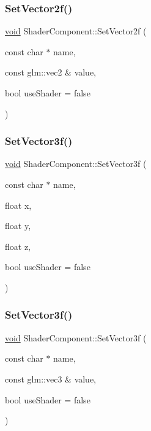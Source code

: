 \subsubsection{\texorpdfstring{Set\+Vector2f()}{SetVector2f()}\hspace{0.1cm}{\footnotesize\ttfamily [2/2]}}
{\footnotesize\ttfamily \hyperlink{imgui__impl__opengl3__loader_8h_ac668e7cffd9e2e9cfee428b9b2f34fa7}{void} Shader\+Component\+::\+Set\+Vector2f (\begin{DoxyParamCaption}\item[{const char $\ast$}]{name,  }\item[{const glm\+::vec2 \&}]{value,  }\item[{bool}]{use\+Shader = {\ttfamily false} }\end{DoxyParamCaption})}

\mbox{\label{classShaderComponent_ad3a7bcb131f85976bda6eecc830dc41b}} 
\subsubsection{\texorpdfstring{Set\+Vector3f()}{SetVector3f()}\hspace{0.1cm}{\footnotesize\ttfamily [1/2]}}
{\footnotesize\ttfamily \hyperlink{imgui__impl__opengl3__loader_8h_ac668e7cffd9e2e9cfee428b9b2f34fa7}{void} Shader\+Component\+::\+Set\+Vector3f (\begin{DoxyParamCaption}\item[{const char $\ast$}]{name,  }\item[{float}]{x,  }\item[{float}]{y,  }\item[{float}]{z,  }\item[{bool}]{use\+Shader = {\ttfamily false} }\end{DoxyParamCaption})}

\mbox{\label{classShaderComponent_adc91769da0d93e210a8f743f898f1e06}} 
\subsubsection{\texorpdfstring{Set\+Vector3f()}{SetVector3f()}\hspace{0.1cm}{\footnotesize\ttfamily [2/2]}}
{\footnotesize\ttfamily \hyperlink{imgui__impl__opengl3__loader_8h_ac668e7cffd9e2e9cfee428b9b2f34fa7}{void} Shader\+Component\+::\+Set\+Vector3f (\begin{DoxyParamCaption}\item[{const char $\ast$}]{name,  }\item[{const glm\+::vec3 \&}]{value,  }\item[{bool}]{use\+Shader = {\ttfamily false} }\end{DoxyParamCaption})}

